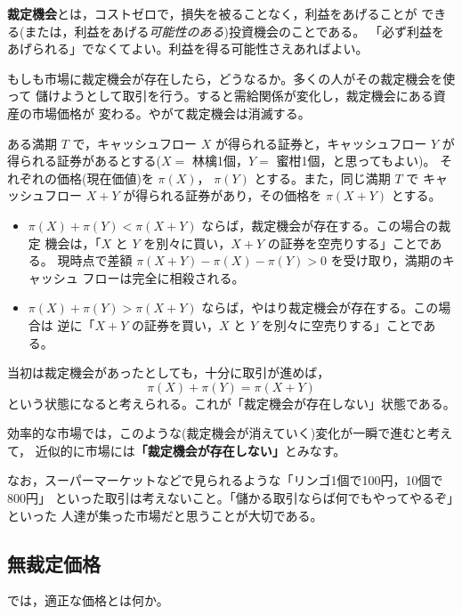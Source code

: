 \begin{definition}[裁定機会]
\textbf{裁定機会}とは，コストゼロで，損失を被ることなく，利益をあげることが
できる(または，利益をあげる\emph{可能性のある})投資機会のことである。
「必ず利益をあげられる」でなくてよい。利益を得る可能性さえあればよい。
\end{definition}

もしも市場に裁定機会が存在したら，どうなるか。多くの人がその裁定機会を使って
儲けようとして取引を行う。すると需給関係が変化し，裁定機会にある資産の市場価格が
変わる。やがて裁定機会は消滅する。

\begin{example}[裁定機会の例]
ある満期 $T$ で，キャッシュフロー $X$ が得られる証券と，キャッシュフロー $Y$ が
得られる証券があるとする($X = $ 林檎1個，$Y = $ 蜜柑1個，と思ってもよい)。
それぞれの価格(現在価値)を $\pi(X)$， $\pi(Y)$ とする。また，同じ満期 $T$ で
キャッシュフロー $X+Y$ が得られる証券があり，その価格を $\pi(X+Y)$ とする。
\begin{itemize}
\item $\pi(X) + \pi(Y) < \pi(X+Y)$ ならば，裁定機会が存在する。この場合の裁定
機会は，「$X$ と $Y$ を別々に買い，$X+Y$ の証券を空売りする」ことである。
現時点で差額 $\pi(X+Y) - \pi(X) - \pi(Y) > 0$ を受け取り，満期のキャッシュ
フローは完全に相殺される。
\item $\pi(X) + \pi(Y) > \pi(X+Y)$ ならば，やはり裁定機会が存在する。この場合は
逆に「$X+Y$ の証券を買い，$X$ と $Y$ を別々に空売りする」ことである。
\end{itemize}
当初は裁定機会があったとしても，十分に取引が進めば，
\[
\pi(X) + \pi(Y) = \pi(X+Y)
\]
という状態になると考えられる。これが「裁定機会が存在しない」状態である。
\end{example}

\begin{keypoint}
効率的な市場では，このような(裁定機会が消えていく)変化が一瞬で進むと考えて，
近似的に市場には\textbf{「裁定機会が存在しない」}とみなす。
\end{keypoint}

なお，スーパーマーケットなどで見られるような「リンゴ1個で100円，10個で800円」
といった取引は考えないこと。「儲かる取引ならば何でもやってやるぞ」といった
人達が集った市場だと思うことが大切である。

\subsection{無裁定価格}

では，適正な価格とは何か。

